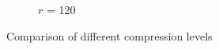 \begin{figure}[h]
\begin{subfigure}{0.32\textwidth}
      \caption{$r$ = 120}
      \label{fig:compressionNC}
  \end{subfigure}
  \caption{Comparison of different compression levels}
  \label{fig:compressionComparison}
\end{figure}
